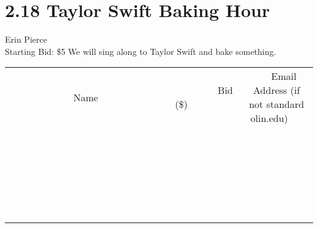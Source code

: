 \documentclass[11pt]{article}
\begin{document}
\section*{2.18 Taylor Swift Baking Hour}
Erin Pierce
\\
Starting Bid: \$5
\newline
We will sing along to Taylor Swift and bake something.
\\[6ex]
\begin{tabular}{c c c}
~~~~~~~~~~~~~Name~~~~~~~~~~~~~ & ~~~~~~~~~Bid (\$)~~~~~~~~~  & ~~~Email Address (if not standard olin.edu)~~~\\
 & & \\
\hline
 & & \\
\hline
 & & \\
\hline
 & & \\
\hline
 & & \\
\hline
 & & \\
\hline
 & & \\
\hline
 & & \\
\hline
 & & \\
\hline
 & & \\
\hline
 & & \\
\hline
 & & \\
\hline
 & & \\
\hline
 & & \\
\hline
 & & \\
\hline
 & & \\
\hline
 & & \\
\hline
 & & \\
\hline
 & & \\
\hline
 & & \\
\hline
 & & \\
\hline
 & & \\
\hline
 & & \\
\hline
 & & \\
\hline
 & & \\
\hline
 & & \\
\hline
\end{tabular}
\newpage
\end{document}
